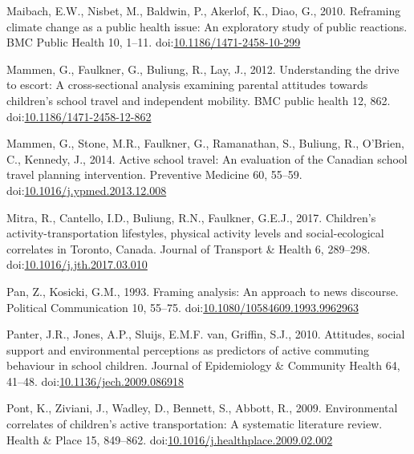 \documentclass[]{elsarticle} %
\begin{document}
\leavevmode\hypertarget{ref-maibachReframingClimateChange2010}{}%
Maibach, E.W., Nisbet, M., Baldwin, P., Akerlof, K., Diao, G., 2010.
Reframing climate change as a public health issue: An exploratory study
of public reactions. BMC Public Health 10, 1--11.
doi:\href{https://doi.org/10.1186/1471-2458-10-299}{10.1186/1471-2458-10-299}

\leavevmode\hypertarget{ref-mammenUnderstandingDriveEscort2012}{}%
Mammen, G., Faulkner, G., Buliung, R., Lay, J., 2012. Understanding the
drive to escort: A cross-sectional analysis examining parental attitudes
towards children's school travel and independent mobility. BMC public
health 12, 862.
doi:\href{https://doi.org/10.1186/1471-2458-12-862}{10.1186/1471-2458-12-862}

\leavevmode\hypertarget{ref-mammenActiveSchoolTravel2014}{}%
Mammen, G., Stone, M.R., Faulkner, G., Ramanathan, S., Buliung, R.,
O'Brien, C., Kennedy, J., 2014. Active school travel: An evaluation of
the Canadian school travel planning intervention. Preventive Medicine
60, 55--59.
doi:\href{https://doi.org/10.1016/j.ypmed.2013.12.008}{10.1016/j.ypmed.2013.12.008}

\leavevmode\hypertarget{ref-mitraChildrenActivitytransportationLifestyles2017}{}%
Mitra, R., Cantello, I.D., Buliung, R.N., Faulkner, G.E.J., 2017.
Children's activity-transportation lifestyles, physical activity levels
and social-ecological correlates in Toronto, Canada. Journal of
Transport \& Health 6, 289--298.
doi:\href{https://doi.org/10.1016/j.jth.2017.03.010}{10.1016/j.jth.2017.03.010}

\leavevmode\hypertarget{ref-panFramingAnalysisApproach1993}{}%
Pan, Z., Kosicki, G.M., 1993. Framing analysis: An approach to news
discourse. Political Communication 10, 55--75.
doi:\href{https://doi.org/10.1080/10584609.1993.9962963}{10.1080/10584609.1993.9962963}

\leavevmode\hypertarget{ref-panterAttitudesSocialSupport2010}{}%
Panter, J.R., Jones, A.P., Sluijs, E.M.F. van, Griffin, S.J., 2010.
Attitudes, social support and environmental perceptions as predictors of
active commuting behaviour in school children. Journal of Epidemiology
\& Community Health 64, 41--48.
doi:\href{https://doi.org/10.1136/jech.2009.086918}{10.1136/jech.2009.086918}

\leavevmode\hypertarget{ref-pontEnvironmentalCorrelatesChildren2009}{}%
Pont, K., Ziviani, J., Wadley, D., Bennett, S., Abbott, R., 2009.
Environmental correlates of children's active transportation: A
systematic literature review. Health \& Place 15, 849--862.
doi:\href{https://doi.org/10.1016/j.healthplace.2009.02.002}{10.1016/j.healthplace.2009.02.002}
\end{document}
